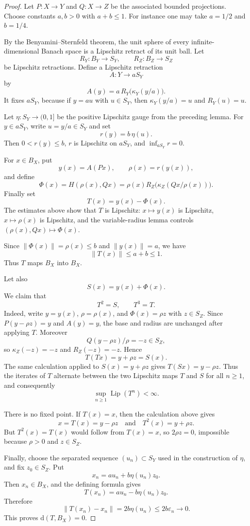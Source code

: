 \documentclass[11pt]{article}
\newcommand{\Lip}{\operatorname{Lip}}
\begin{document}
\begin{proof}
Let \(P:X\to Y\) and \(Q:X\to Z\) be the associated bounded projections.
Choose constants \(a,b>0\) with \(a+b\le1\).  For instance one may take
\(a=1/2\) and \(b=1/4\).

By the Benyamini--Sternfeld theorem, the unit sphere of every
infinite-dimensional Banach space is a Lipschitz retract of its unit ball.
Let
\[
R_Y:B_Y\to S_Y,\qquad R_Z:B_Z\to S_Z
\]
be Lipschitz retractions.  Define a Lipschitz retraction
\[
A:Y\to aS_Y
\]
by
\[
A(y)=a\,R_Y\bigl(\kappa_Y(y/a)\bigr).
\]
It fixes \(aS_Y\), because if \(y=au\) with \(u\in S_Y\), then
\(\kappa_Y(y/a)=u\) and \(R_Y(u)=u\).

Let \(\eta:S_Y\to(0,1]\) be the positive Lipschitz gauge from the preceding
lemma.  For \(y\in aS_Y\), write \(u=y/a\in S_Y\) and set
\[
r(y)=b\,\eta(u).
\]
Then \(0<r(y)\le b\), \(r\) is Lipschitz on \(aS_Y\), and
\(\inf_{aS_Y}r=0\).

For \(x\in B_X\), put
\[
y(x)=A(Px),\qquad \rho(x)=r(y(x)),
\]
and define
\[
\Phi(x)=H(\rho(x),Qx)
=\rho(x)R_Z\bigl(\kappa_Z(Qx/\rho(x))\bigr).
\]
Finally set
\[
T(x)=y(x)-\Phi(x).
\]
The estimates above show that \(T\) is Lipschitz: \(x\mapsto y(x)\) is
Lipschitz, \(x\mapsto\rho(x)\) is Lipschitz, and the variable-radius lemma
controls \((\rho(x),Qx)\mapsto\Phi(x)\).

Since \(\|\Phi(x)\|=\rho(x)\le b\) and \(\|y(x)\|=a\), we have
\[
\|T(x)\|\le a+b\le1.
\]
Thus \(T\) maps \(B_X\) into \(B_X\).

Let also
\[
S(x)=y(x)+\Phi(x).
\]
We claim that
\[
T^2=S,\qquad T^3=T.
\]
Indeed, write \(y=y(x)\), \(\rho=\rho(x)\), and
\(\Phi(x)=\rho z\) with \(z\in S_Z\).  Since \(P(y-\rho z)=y\) and
\(A(y)=y\), the base and radius are unchanged after applying \(T\).  Moreover
\[
Q(y-\rho z)/\rho=-z\in S_Z,
\]
so \(\kappa_Z(-z)=-z\) and \(R_Z(-z)=-z\).  Hence
\[
T(Tx)=y+\rho z=S(x).
\]
The same calculation applied to \(S(x)=y+\rho z\) gives \(T(Sx)=y-\rho z\).
Thus the iterates of \(T\) alternate between the two Lipschitz maps \(T\) and
\(S\) for all \(n\ge1\), and consequently
\[
\sup_{n\ge1}\Lip(T^n)<\infty .
\]

There is no fixed point.  If \(T(x)=x\), then the calculation above gives
\[
x=T(x)=y-\rho z
\quad\text{and}\quad
T^2(x)=y+\rho z.
\]
But \(T^2(x)=T(x)\) would follow from \(T(x)=x\), so \(2\rho z=0\), impossible
because \(\rho>0\) and \(z\in S_Z\).

Finally, choose the separated sequence \((u_n)\subset S_Y\) used in the
construction of \(\eta\), and fix \(z_0\in S_Z\).  Put
\[
x_n=a u_n+b\eta(u_n)z_0.
\]
Then \(x_n\in B_X\), and the defining formula gives
\[
T(x_n)=a u_n-b\eta(u_n)z_0.
\]
Therefore
\[
\|T(x_n)-x_n\|=2b\eta(u_n)\le2b\varepsilon_n\to0.
\]
This proves \(\mathrm d(T,B_X)=0\).
\end{proof}
\end{document}
